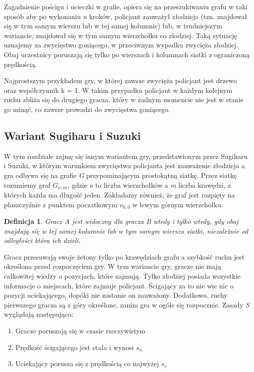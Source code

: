 \documentclass[brudnopis]{xmgr}
\newtheorem{Definicja}{Definicja}
\begin{document}
Zagadnienie pościgu i ucieczki w grafie, opiera się na przeszukiwaniu grafu w taki sposób aby po wykonaniu \textit{n} kroków, policjant zauważył złodzieja (tzn. znajdował się w tym samym wierszu lub w tej samej kolumnie) lub, w trudniejszym wariancie, znajdował się w tym samym wierzchołku co złodziej. Taką sytuację uznajemy za zwycięstwo goniącego, w przeciwnym wypadku zwycięża złodziej. Obaj uczestnicy poruszają się tylko po wierszach i kolumnach siatki z ograniczoną prędkością.

Najprostszym przykładem gry, w której zawsze zwycięża policjant jest drzewo oraz współczynnik k = 1. W takim przypadku policjant w każdym kolejnym ruchu zbliża się do drugiego gracza, który w żadnym momencie nie jest w stanie go minąć, co zawsze prowadzi do zwycięstwa goniącego.

\subsection{Wariant Sugiharu i Suzuki}
W tym rozdziale zajmę się innym wariantem gry, przedstawionym przez Sugiharu i Suzuki, w którym warunkiem zwycięstwa policjanta jest zauważenie złodzieja a gra odbywa się na grafie \textit{G} przypominającym prostokątną siatkę.
Przez siatkę rozumiemy graf \textit{$G_{n,m}$}, gdzie \textit{n} to liczba wierzchołków a \textit{m} liczba krawędzi, z których każda ma długość jeden. Zakładamy również, że graf jest rozpięty na płaszczyźnie z punktem poczatkowym \textit{$v_{0,0}$} w lewym górnym wierzchołku.
\begin{Definicja}
  Gracz A \textnormal{jest widoczny} dla gracza B wtedy i tylko wtedy, gdy obaj znajdują się w tej samej kolumnie lub w tym samym wierszu siatki, niezależnie od odległości która ich dzieli.
\end{Definicja}

Gracz przesuwają swoje żetony tylko po krawędziach grafu a szybkość ruchu jest określona przed rozpoczęciem gry.
W tym wariancie gry, gracze nie mają całkowitej wiedzy o pozycjach, które zajmują. Tylko złodziej posiada wszystkie informacje o miejscach, które zajmuje policjant. Ścigający za to nie wie nic o pozycji uciekającego, dopóki nie zostanie on zauważony. Dodatkowo, ruchy pierwszego gracza są z góry określone, zanim gra w ogóle się rozpocznie.
Zasady \textit{S} wyglądają następująco:
\begin{enumerate}
  \item Gracze poruszają się w czasie rzeczywistym
  \item Prędkość ścigającego jest stała i wynosi $s_n$
  \item Uciekający porusza się z prędkością co najwyżej $s_c$
\end{enumerate}
\end{document}
